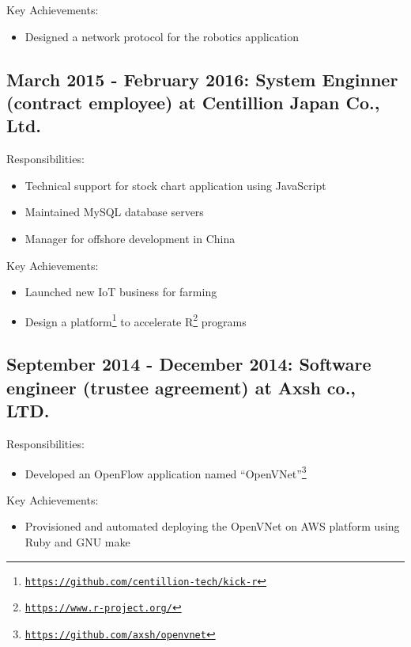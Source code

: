 \documentclass[letterpaper]{article}
\begin{document}
\noindent Key Achievements:

\begin{itemize}
  \item Designed a network protocol for the robotics application
\end{itemize}

\subsection*{March 2015 - February 2016: System Enginner (contract employee) at Centillion Japan Co., Ltd.}

\noindent Responsibilities:

\begin{itemize}
  \item Technical support for stock chart application using JavaScript
  \item Maintained MySQL database servers
  \item Manager for offshore development in China
\end{itemize}

\noindent Key Achievements:

\begin{itemize}
  \item Launched new IoT business for farming
  \item Design a platform\footnote{\href{https://github.com/centillion-tech/kick-r}{\tt https://github.com/centillion-tech/kick-r}} to accelerate R\footnote{\href{https://www.r-project.org/}{\tt https://www.r-project.org/}} programs
\end{itemize}

\subsection*{September 2014 - December 2014: Software engineer (trustee agreement) at Axsh co., LTD.}

\noindent Responsibilities:

\begin{itemize}
  \item Developed an OpenFlow application named ``OpenVNet''\footnote{\href{https://github.com/axsh/openvnet}{\tt https://github.com/axsh/openvnet}}
\end{itemize}

\noindent Key Achievements:

\begin{itemize}
  \item Provisioned and automated deploying the OpenVNet on AWS platform using Ruby and GNU make
\end{itemize}
\end{document}
